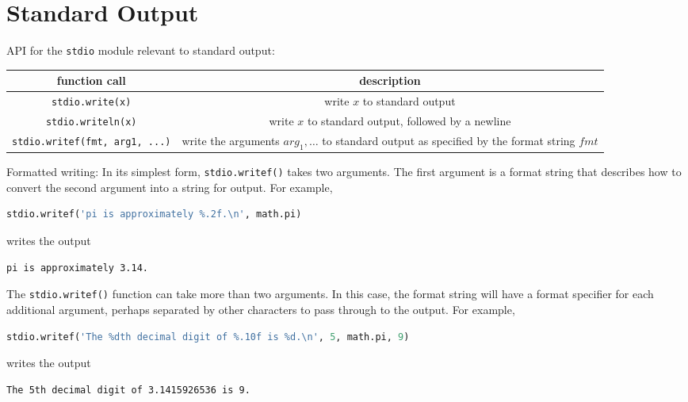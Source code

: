 \documentclass[8pt,a4paper,compress,handout]{beamer}
\begin{document}
\section{Standard Output}
\begin{frame}[fragile]
API for the \lstinline{stdio} module relevant to standard output:
\begin{center}
\begin{tabular}{cc}
function call & description \\ \hline
\lstinline$stdio.write(x)$ & write $x$ to standard output \\
\lstinline$stdio.writeln(x)$ & write $x$ to standard output, followed by a newline \\
\lstinline$stdio.writef(fmt, arg1, ...)$ & \makecell{write the arguments $arg_1, \dots$ to standard output \\ as specified by the format string $fmt$} \\
\end{tabular} 
\end{center}

\bigskip

Formatted writing: In its simplest form, \lstinline{stdio.writef()} takes two arguments. The first argument is a format string that describes how to convert the second argument into a string for output.  For example, 
\begin{lstlisting}[language=Python]
stdio.writef('pi is approximately %.2f.\n', math.pi)
\end{lstlisting}
writes the output
\begin{lstlisting}[language={}]
pi is approximately 3.14.
\end{lstlisting}

\bigskip

The \lstinline{stdio.writef()} function can take more than two arguments.
In this case, the format string will have a format specifier for each additional argument, perhaps separated by other characters to pass through to the output. For example, 
\begin{lstlisting}[language=Python]
stdio.writef('The %dth decimal digit of %.10f is %d.\n', 5, math.pi, 9)
\end{lstlisting}
writes the output
\begin{lstlisting}[language={}]
The 5th decimal digit of 3.1415926536 is 9.
\end{lstlisting}
\end{frame}
\end{document}
